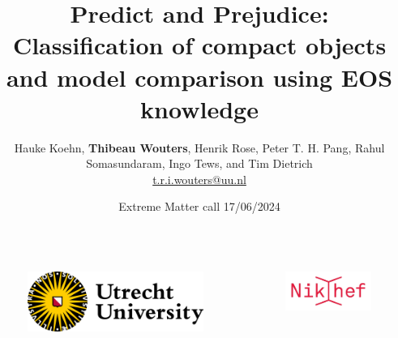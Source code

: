 \documentclass[usenames,dvipsnames,t]{beamer}
\title[Predict and prejudice] %
{Predict and Prejudice:\\ Classification of compact objects and model comparison using EOS knowledge}
\author[Thibeau Wouters]{Hauke Koehn, \textbf{Thibeau Wouters}, Henrik Rose, Peter T. H. Pang, Rahul Somasundaram, Ingo Tews, and Tim Dietrich \\ \vspace{2mm} \href{mailto:t.r.i.wouters@uu.nl}{t.r.i.wouters@uu.nl} \\ \vspace{2mm} \github \quad \linkedin \quad \twitter}
\date[17/06/2024]{Extreme Matter call 17/06/2024}
\begin{document}
{


\begin{frame}[plain]
\titlepage

\begin{columns}
  \begin{figure}
    \centering
    \vspace{1.5mm}
    \includegraphics[width=0.55\linewidth]{Figures/utrecht-university.png}
  \end{figure}
  \begin{figure}
    \centering
    \includegraphics[width=0.55\linewidth]{Figures/Nikhef_logo-transparent.png}
  \end{figure}
\end{columns}

\end{frame}
}

\end{document}
